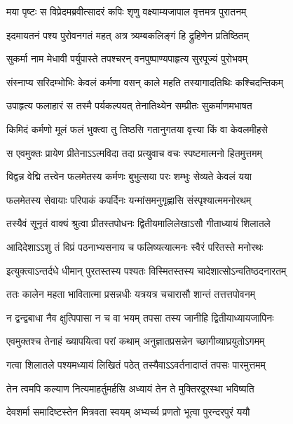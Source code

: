 \twolineshloka
{मया पृष्टः स विप्रेदमब्रवीत्सादरं कपिः}
{शृणु वक्ष्याम्यजापाल वृत्तमत्र पुरातनम्} %

\twolineshloka
{इदमायतनं पश्य पुरोवनगतं महत्}
{अत्र त्र्यम्बकलिङ्गं हि द्रुहिणेन प्रतिष्ठितम्} %

\twolineshloka
{सुकर्मा नाम मेधावी पर्युपास्ते तपश्चरन्}
{वनपुष्पाण्यपाहृत्य सुरपूज्यं पुरोभवम्} %

\twolineshloka
{संस्नाप्य सरिदम्भोभिः केवलं कर्मणा वसन्}
{काले महति तस्यागादतिथिः कश्चिदन्तिकम्} %

\twolineshloka
{उपाहृत्य फलाहारं स तस्मै पर्यकल्पयत्}
{तेनातिथ्येन सम्प्रीतः सुकर्माणमभाषत} %

\twolineshloka
{किमिदं कर्मणो मूलं फलं भुक्त्वा तु तिष्ठसि}
{गतानुगतया वृत्त्या किं वा केवलमीहसे} %

\twolineshloka
{स एवमुक्तः प्रायेण प्रीतेनाऽऽत्मविदा तदा}
{प्रत्युवाच वचः स्पष्टमात्मनो हितमुत्तमम्} %

\twolineshloka
{विद्वन्न वेद्मि तत्त्वेन फलमेतस्य कर्मणः}
{बुभुत्सया परः शम्भुः सेव्यते केवलं यया} %

\twolineshloka
{फलमेतस्य सेवायाः परिपाकं कपर्दिनः}
{यन्मांसमनुगृह्णासि संस्पृश्यात्ममनोरथम्} %

\twolineshloka
{तस्यैवं सूनृतं वाक्यं श्रुत्वा प्रीतस्तपोधनः}
{द्वितीयमालिलेखाऽसौ गीताध्यायं शिलातले} %

\twolineshloka
{आदिदेशाऽऽशु तं विप्रं पठनाभ्यसनाय च}
{फलिष्यत्यात्मनः स्वैरं परितस्ते मनोरथः} %

\twolineshloka
{इत्युक्त्वाऽन्तर्दधे धीमान् पुरतस्तस्य पश्यतः}
{विस्मितस्तस्य चादेशात्सोऽन्वतिष्ठदनारतम्} %

\twolineshloka
{ततः कालेन महता भावितात्मा प्रसन्नधीः}
{यत्रयत्र चचारासौ शान्तं तत्तत्तपोवनम्} %

\twolineshloka
{न द्वन्द्वबाधा नैव क्षुत्पिपासा न च वा भयम्}
{तपसा तस्य जानीहि द्वितीयाध्यायजापिनः} %


\twolineshloka
{एवमुक्तश्च तेनाहं ख्यापयित्वा परां कथाम्}
{अनुज्ञातप्रसन्नेन च्छागीव्याघ्रयुतोऽगमम्} %

\twolineshloka
{गत्वा शिलातले पश्यमध्यायं लिखितं पठेत्}
{तस्यैवाऽऽवर्तनादाप्तं तपसः पारमुत्तमम्} %

\twolineshloka
{तेन त्वमपि कल्याण नित्यमाहर्तुमर्हसि}
{अध्यायं तेन ते मुक्तिरदूरस्था भविष्यति} %

\twolineshloka
{देवशर्मा समादिष्टस्तेन मित्रवता स्वयम्}
{अभ्यर्च्य प्रणतो भूत्वा पुरन्दरपुरं ययौ} %


